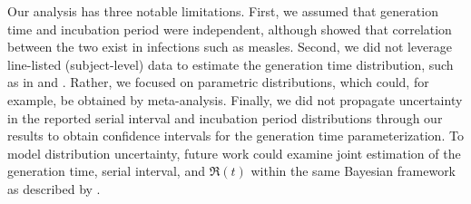 \par
Our analysis has three notable limitations.  %
First, we assumed that
generation time and incubation period were independent,
although \textcite{Klinkenberg2011} showed that correlation between the two exist in infections such as measles.  %
Second, we did not leverage line-listed (subject-level) data  %
to estimate the generation time distribution,                          %
such as in \cite{Ganyani2020} and \cite{Klinkenberg2011}.   %
Rather, we focused on parametric distributions,                    %
which could, for example, be obtained by meta-analysis.     %
Finally, we did not propagate uncertainty in the reported
serial interval and incubation period distributions
through our results to obtain confidence intervals for
the generation time parameterization.                                 %
To model distribution uncertainty,                                         %
future work could examine joint estimation of
the generation time, serial interval, and $\Re(t)$ within
the same Bayesian framework as described by \cite{Cori2013}.


